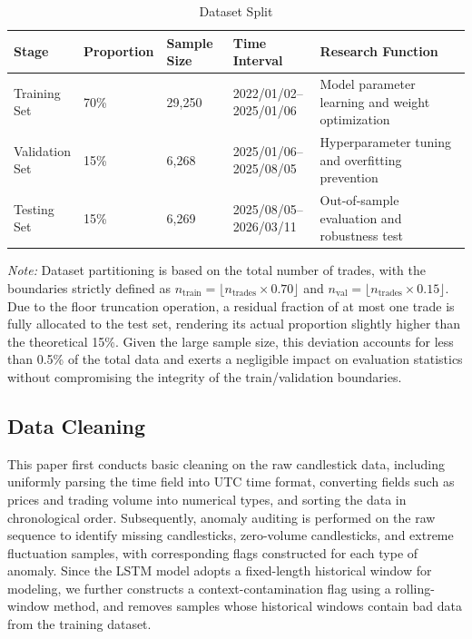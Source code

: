 \documentclass[12pt]{article}
\begin{document}
\begin{table}[H]
\centering
\caption{Dataset Split}
\label{tab:dataset_split}
\small
\setlength{\tabcolsep}{4pt}
\renewcommand{\arraystretch}{1.2}
\begin{tabular}{p{}p{}p{}p{}p{}}
\toprule
Stage & Proportion & Sample Size & Time Interval & Research Function \\
\midrule
\makecell{Training\\Set} &
70\% &
29,250 &
\makecell{2022/01/02--\\2025/01/06} &
Model parameter learning and weight optimization \\

\makecell{Validation\\Set} &
15\% &
6,268 &
\makecell{2025/01/06--\\2025/08/05} &
Hyperparameter tuning and overfitting prevention \\

\makecell{Testing\\Set} &
15\% &
6,269 &
\makecell{2025/08/05--\\2026/03/11} &
Out-of-sample evaluation and robustness test \\
\bottomrule
\end{tabular}
    \vspace{6pt} 
    \parbox{\textwidth}{\footnotesize \textit{Note:} Dataset partitioning is based on the 
    total number of trades, with the boundaries strictly defined as 
    $n_{\text{train}} = \lfloor n_{\text{trades}} \times 0.70 \rfloor$ and $n_{\text{val}} = \lfloor n_{\text{trades}} \times 0.15 \rfloor$. 
    Due to the floor truncation operation, a residual fraction of at most one trade is fully 
    allocated to the test set, rendering its actual proportion slightly higher than the 
    theoretical 15\%. Given the large sample size, this deviation accounts for less than 
    0.5\% of the total data and exerts a negligible impact on evaluation statistics without 
    compromising the integrity of the train/validation boundaries.}
\end{table}

\subsection{Data Cleaning}

This paper first conducts basic cleaning on the raw candlestick data, including uniformly 
parsing the time field into UTC time format, converting fields such as prices and trading 
volume into numerical types, and sorting the data in chronological order. Subsequently, 
anomaly auditing is performed on the raw sequence to identify missing candlesticks, 
zero-volume candlesticks, and extreme fluctuation samples, with corresponding flags 
constructed for each type of anomaly. Since the LSTM model adopts a fixed-length historical 
window for modeling, we further constructs a context-contamination flag using a 
rolling-window method, and removes samples whose historical windows contain bad data from the 
training dataset.
\end{document}
